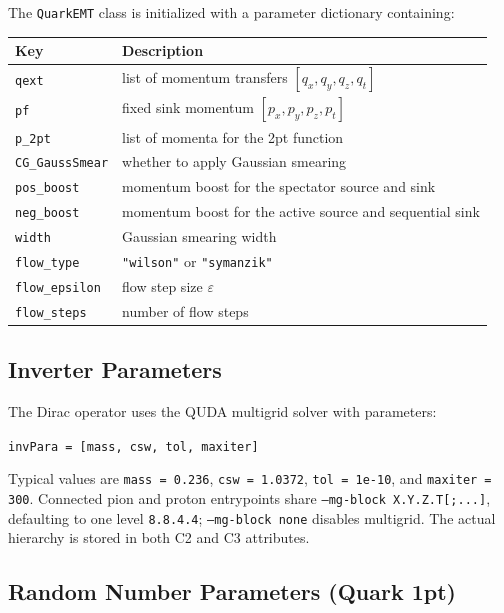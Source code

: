 \documentclass[11pt,a4paper]{article}
\newcommand{\code}[1]{\texttt{#1}}
\begin{document}
The \code{QuarkEMT} class is initialized with a parameter dictionary containing:

\begin{center}
\begin{tabular}{@{}ll@{}}
\toprule
\textbf{Key} & \textbf{Description} \\
\midrule
\code{qext}       & list of momentum transfers $[q_x, q_y, q_z, q_t]$ \\
\code{pf}         & fixed sink momentum $[p_x, p_y, p_z, p_t]$ \\
\code{p\_2pt}     & list of momenta for the 2pt function \\
\code{CG\_GaussSmear} & whether to apply Gaussian smearing \\
\code{pos\_boost} & momentum boost for the spectator source and sink \\
\code{neg\_boost} & momentum boost for the active source and sequential sink \\
\code{width}      & Gaussian smearing width \\
\code{flow\_type} & \code{"wilson"} or \code{"symanzik"} \\
\code{flow\_epsilon} & flow step size $\varepsilon$ \\
\code{flow\_steps}   & number of flow steps \\
\bottomrule
\end{tabular}
\end{center}

\subsection{Inverter Parameters}
\label{sec:inv_par}

The Dirac operator uses the QUDA multigrid solver with parameters:
\begin{center}
\code{invPara = [mass, csw, tol, maxiter]}
\end{center}
Typical values are \code{mass = 0.236}, \code{csw = 1.0372},
\code{tol = 1e-10}, and \code{maxiter = 300}.  Connected pion and proton
entrypoints share \code{--mg-block X.Y.Z.T[;...]}, defaulting to one level
\code{8.8.4.4}; \code{--mg-block none} disables multigrid.  The actual
hierarchy is stored in both C2 and C3 attributes.

\subsection{Random Number Parameters (Quark 1pt)}
\label{sec:rand_par}
\end{document}
